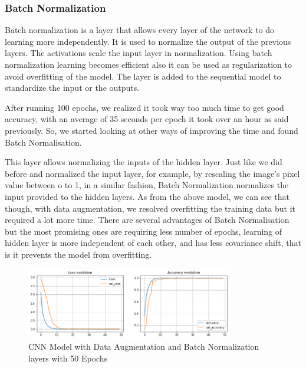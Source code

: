 \documentclass[conference]{IEEEtran}
\begin{document}
\subsubsection{Batch Normalization}

Batch normalization is a layer that allows every layer of the network to do learning more independently. It is used to normalize the output of the previous layers. The activations scale the input layer in normalization. Using batch normalization learning becomes efficient also it can be used as regularization to avoid overfitting of the model. The layer is added to the sequential model to standardize the input or the outputs.

After running 100 epochs, we realized it took way too much time to get good accuracy, with an average of 35 seconds per epoch it took over an hour as said previously. So, we started looking at other ways of improving the time and found Batch Normalisation.

This layer allows normalizing the inputs of the hidden layer. Just like we did before and normalized the input layer, for example, by rescaling the image’s pixel value between o to 1, in a similar fashion, Batch Normalization normalizes the input provided to the hidden layers. As from the above model, we can see that though, with data augmentation, we resolved overfitting the training data but it required a lot more time. There are several advantages of Batch Normalisation but the most promising ones are requiring less number of epochs, learning of hidden layer is more independent of each other, and has less covariance shift, that is it prevents the model from overfitting.

\begin{figure}[htbp]
    \centerline{\includegraphics[width=9cm]{img/final_model_batch_50ep.png}}
    \caption{CNN Model with Data Augmentation and Batch Normalization layers with 50 Epochs}
    \label{fig:hist_train_classes}
\end{figure}
\end{document}
